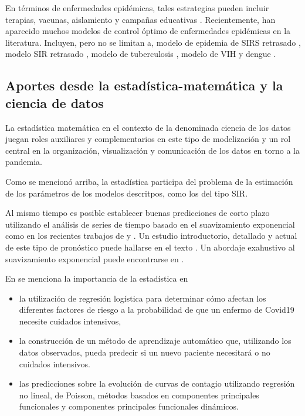 \documentclass{article}
\begin{document}
  
 
 En términos de enfermedades epidémicas, tales estrategias pueden incluir terapias, vacunas, aislamiento y campañas educativas \cite{BKO,C}. Recientemente, han aparecido muchos modelos de control óptimo de enfermedades epidémicas en la literatura. Incluyen, pero no se limitan a, modelo de epidemia de SIRS retrasado \cite{AAC}, modelo SIR retrasado \cite{ALA,BGO}, modelo de tuberculosis \cite{ST}, modelo de VIH \cite{HY} y dengue \cite{AGS}.
 \newline 
 
 
 
 
 \subsection{Aportes desde la estadística-matemática y la ciencia de datos} 
  
La estadística matemática en el contexto de la denominada  ciencia de los datos juegan roles auxiliares y  complementarios en este tipo de modelización y un rol central en la organización, visualización y comunicación de los datos en torno a la pandemia. 


Como se mencionó arriba, la estadística participa del problema de la estimación de los parámetros de los modelos descritpos, como los del tipo SIR.   

Al mismo tiempo es posible establecer buenas predicciones de corto plazo utilizando el análisis de series de tiempo basado en el suavizamiento exponencial como en los recientes trabajos de \cite{JZC} y \cite{PM}. Un estudio introductorio, detallado y actual de este tipo de pronóstico puede hallarse en el texto  \cite{AthaHynd}.  Un abordaje exahustivo al suavizamiento exponencial puede encontrarse en \cite{Hyndvarios}. 

En \cite{coldm} se menciona  la importancia de la estadística en
\begin{itemize}
	\item la utilización de regresión logística para determinar cómo afectan los diferentes factores de riesgo a la probabilidad de que un enfermo de Covid19 necesite cuidados intensivos,
	\item la construcción de un método de aprendizaje automático que, utilizando los datos observados, pueda predecir si un nuevo paciente necesitará o no cuidados intensivos. 
	\item  las predicciones sobre la evolución de curvas de contagio utilizando regresión no lineal, de Poisson, métodos basados en componentes principales funcionales y componentes principales funcionales dinámicos.  
\end{itemize}
\end{document}

